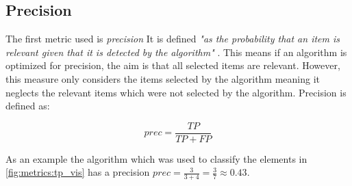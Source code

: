 \subsection{Precision}
\label{chp:fundamentals:sec:metrics:subsec:precision}

The first metric used is \textit{precision}
It is defined \textit{"as the probability that an item is relevant given that it is detected by the algorithm"} \parencite{Zhu:2004}.
This means if an algorithm is optimized for precision, the aim is that all selected items are relevant.
However, this measure only considers the items selected by the algorithm meaning it neglects the relevant items which were not selected by the algorithm.
Precision is defined as:

\begin{equation}\label{eq:precision}
    prec = \frac{TP}{TP+FP}
\end{equation}

As an example the algorithm which was used to classify the elements in \cref{fig:metrics:tp_vis} has a precision $prec = \frac{3}{3+4} = \frac{3}{7}\approx 0.43$.
